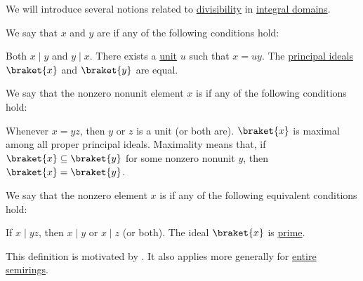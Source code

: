 \begin{definition}\label{def:domain_divisibility}\mimprovised
  We will introduce several notions related to \hyperref[def:divisibility]{divisibility} in \hyperref[def:integral_domain]{integral domains}.

  \begin{thmenum}
     We say that \( x \) and \( y \) are  if any of the following conditions hold:
    \begin{thmenum}
       Both \( x \mid y \) and \( y \mid x \).
       There exists a \hyperref[def:divisibility/unit]{unit} \( u \) such that \( x = uy \).
       The \hyperref[def:semiring_ideal/principal]{principal ideals} \( \braket{ x } \) and \( \braket{ y } \) are equal.
    \end{thmenum}

     We say that the nonzero nonunit element \( x \) is  if any of the following conditions hold:
    \begin{thmenum}
       Whenever \( x = yz \), then \( y \) or \( z \) is a unit (or both are).
       \( \braket{ x } \) is maximal among all proper principal ideals. Maximality means that, if \( \braket{ x } \subseteq \braket{ y } \) for some nonzero nonunit \( y \), then \( \braket{ x } = \braket{ y } \).
    \end{thmenum}

     We say that the nonzero element \( x \) is  if any of the following equivalent conditions hold:
    \begin{thmenum}
       If \( x \mid yz \), then \( x \mid y \) or \( x \mid z \) (or both).
       The ideal \( \braket{ x } \) is \hyperref[def:semiring_ideal/prime]{prime}.
    \end{thmenum}

    This definition is motivated by . It also applies more generally for \hyperref[def:entire_semiring]{entire semirings}.
  \end{thmenum}
\end{definition}
